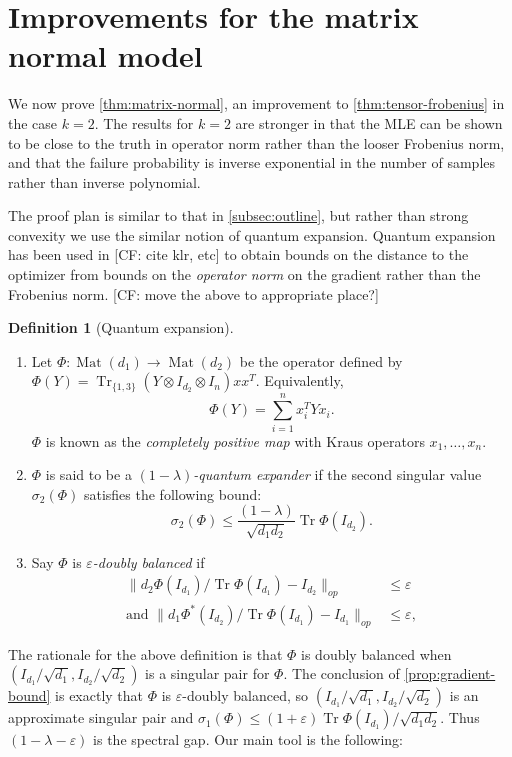 \documentclass[aos]{imsart}
\theoremstyle{definition}
\newtheorem{definition}{Definition}
\DeclareMathOperator{\mat}{Mat}
\DeclareMathOperator{\tr}{Tr}
\newcommand{\ot}{\otimes}
\newcommand{\eps}{\varepsilon}
\newcommand{\samp}{x}
\newcommand{\CF}[1]{{\color{purple}[CF: #1]}}
\begin{document}
\section{Improvements for the matrix normal model}\label{sec:matrix-normal}
We now prove \cref{thm:matrix-normal}, an improvement to \cref{thm:tensor-frobenius} in the case $k=2$. The results for $k = 2$ are stronger in that the MLE can be shown to be close to the truth in operator norm rather than the looser Frobenius norm, and that the failure probability is inverse exponential in the number of samples rather than inverse polynomial.




The proof plan is similar to that in \cref{subsec:outline}, but rather than strong convexity we use the similar notion of quantum expansion. Quantum expansion has been used in \CF{cite klr, etc} to obtain bounds on the distance to the optimizer from bounds on the \emph{operator norm} on the gradient rather than the Frobenius norm.
\CF{move the above to appropriate place?}
\begin{definition}[Quantum expansion]
$ $
\begin{enumerate}
\item Let $\Phi:\mat(d_1) \to \mat(d_2)$ be the operator defined by $\Phi(Y) = \tr_{\{1,3\}} ( Y \ot I_{d_2} \ot I_{n}) \samp \samp^T$. Equivalently,
$$\Phi(Y) = \sum_{i = 1}^n \samp_i^T Y \samp_i.$$
$\Phi$ is known as the \emph{completely positive map} with Kraus operators $\samp_1, \dots, \samp_n$.
\item $\Phi$ is said to be a \emph{$(1 - \lambda)$-quantum expander} if the second singular value $\sigma_2(\Phi)$ satisfies the following bound:
$$\sigma_2(\Phi) \leq \frac{(1 - \lambda)}{\sqrt{d_1d_2}} \tr \Phi(I_{d_2}).$$
\item Say $\Phi$ is \emph{$\eps$-doubly balanced} if
\begin{align*}
\|d_2 \Phi(I_{d_1})/\tr \Phi(I_{d_1})  - I_{d_2} \|_{op}& \leq \eps\\
\textrm{and }\|d_1 \Phi^*(I_{d_2})/\tr \Phi(I_{d_1})  - I_{d_1}  \|_{op} & \leq \eps,
\end{align*}
\end{enumerate}
\end{definition}

The rationale for the above definition is that $\Phi$ is doubly balanced when $(I_{d_1}/\sqrt{d_1}, I_{d_2}/\sqrt{d_2})$ is a singular pair for $\Phi$. The conclusion of \cref{prop:gradient-bound} is exactly that $\Phi$ is $\eps$-doubly balanced, so $(I_{d_1}/\sqrt{d_1}, I_{d_2}/\sqrt{d_2})$ is an approximate singular pair and $\sigma_1(\Phi) \leq (1+\eps)  \tr \Phi(I_{d_1})/\sqrt{d_1 d_2}$. Thus $(1-\lambda - \eps)$ is the spectral gap.
Our main tool is the following:
\end{document}
